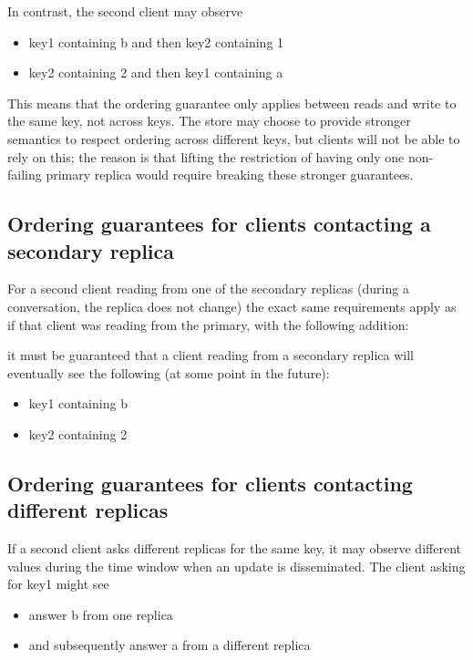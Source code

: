 \documentclass{article}
\begin{document}
In contrast, the second client may observe
\begin{itemize}
    \item key1 containing b and then key2 containing 1
    \item key2 containing 2 and then key1 containing a
\end{itemize}

This means that the ordering guarantee only applies between reads and write to the same key, not across keys. The store may choose to provide stronger semantics to respect ordering across different keys, but clients will not be able to rely on this; the reason is that lifting the restriction of having only one non-failing primary replica would require breaking these stronger guarantees.

\subsection{Ordering guarantees for clients contacting a secondary replica}

For a second client reading from one of the secondary replicas (during a conversation, the replica does not change) the exact same requirements apply as if that client was reading from the primary, with the following addition:

it must be guaranteed that a client reading from a secondary replica will eventually see the following (at some point in the future):

\begin{itemize}
    \item key1 containing b
    \item key2 containing 2
\end{itemize}

\subsection{Ordering guarantees for clients contacting different replicas}

If a second client asks different replicas for the same key, it may observe different values during the time window when an update is disseminated. The client asking for key1 might see

\begin{itemize}
    \item answer b from one replica
    \item and subsequently answer a from a different replica
\end{itemize}
\end{document}

